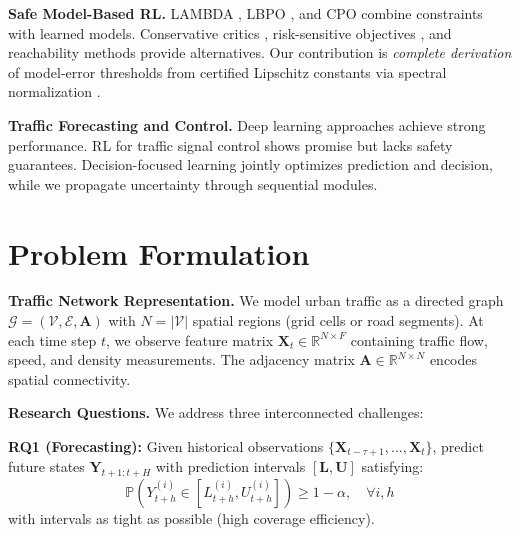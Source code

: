 \documentclass{article}
\theoremstyle{plain}
\theoremstyle{definition}
\theoremstyle{remark}
\begin{document}
\textbf{Safe Model-Based RL.} LAMBDA \citep{as2022constrained}, LBPO \citep{sikchi2022lyapunov}, and CPO \citep{achiam2017constrained} combine constraints with learned models. Conservative critics \citep{bharadhwaj2021conservative}, risk-sensitive objectives \citep{ma2021conservative,tang2019worst}, and reachability methods \citep{fisac2019bridging,bajcsy2019efficient} provide alternatives. Our contribution is \emph{complete derivation} of model-error thresholds from certified Lipschitz constants via spectral normalization \citep{miyato2018spectral,gouk2021regularisation}.

\textbf{Traffic Forecasting and Control.} Deep learning approaches \citep{li2018dcrnn,yu2018spatio,wu2019graph,song2020spatial,zheng2020gman,chen2021z,jiang2021dltraff,cirstea2022towards} achieve strong performance. RL for traffic signal control \citep{wei2019presslight,wei2018intellilight,chen2020toward,zhang2022expression,oroojlooy2020deep} shows promise but lacks safety guarantees. Decision-focused learning \citep{wang2024aster,wilder2019melding,elmachtoub2022smart} jointly optimizes prediction and decision, while we propagate uncertainty through sequential modules.

\section{Problem Formulation}
\label{sec:problem}

\textbf{Traffic Network Representation.} We model urban traffic as a directed graph $\mathcal{G} = (\mathcal{V}, \mathcal{E}, \mathbf{A})$ with $N = |\mathcal{V}|$ spatial regions (grid cells or road segments). At each time step $t$, we observe feature matrix $\mathbf{X}_t \in \mathbb{R}^{N \times F}$ containing traffic flow, speed, and density measurements. The adjacency matrix $\mathbf{A} \in \mathbb{R}^{N \times N}$ encodes spatial connectivity.

\textbf{Research Questions.} We address three interconnected challenges:

\textbf{RQ1 (Forecasting):} Given historical observations $\{\mathbf{X}_{t-\tau+1}, \ldots, \mathbf{X}_t\}$, predict future states $\mathbf{Y}_{t+1:t+H}$ with prediction intervals $[\mathbf{L}, \mathbf{U}]$ satisfying:
\begin{equation}
\mathbb{P}(Y_{t+h}^{(i)} \in [L_{t+h}^{(i)}, U_{t+h}^{(i)}]) \geq 1 - \alpha, \quad \forall i, h
\label{eq:coverage}
\end{equation}
with intervals as tight as possible (high coverage efficiency).
\end{document}
